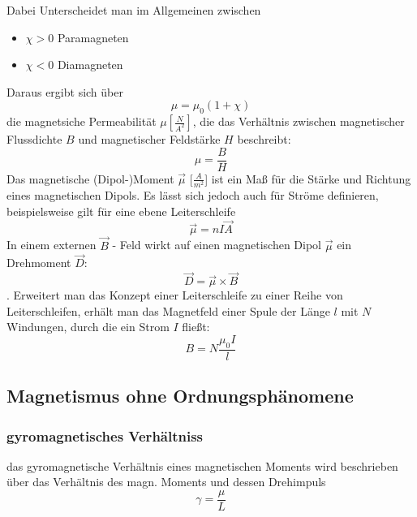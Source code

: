             Dabei Unterscheidet man im Allgemeinen zwischen
            \begin{itemize}
                \item $\chi > 0$ Paramagneten
                \item $\chi < 0$ Diamagneten
            \end{itemize}
            Daraus ergibt sich über
            \begin{equation}
                \mu = \mu_0 (1 + \chi)
            \end{equation}
            die magnetsiche Permeabilität $\mu [\frac{N}{A^2}]$, die das Verhältnis zwischen magnetischer Flussdichte $B$ und magnetischer Feldstärke $H$ beschreibt:
            $$ \mu = \frac{B}{H}$$
            Das magnetische (Dipol-)Moment $\vec{\mu}$ [$\frac{A}{m^2}$] ist ein Maß für die Stärke
            und Richtung eines magnetischen Dipols. Es lässt sich jedoch auch für Ströme definieren, beispielsweise gilt für eine ebene
            Leiterschleife
            \begin{equation}
                \vec{\mu} = n I \vec{A}
            \end{equation}
            In einem externen $\vec{B}$ - Feld wirkt auf einen magnetischen Dipol $\vec{\mu}$ ein Drehmoment $\vec{D}$:
            \begin{equation}
                \vec{D} = \vec{\mu} \times \vec{B}
            \end{equation}.
            Erweitert man das Konzept einer Leiterschleife zu einer Reihe von Leiterschleifen, erhält man das Magnetfeld einer Spule der Länge $l$ mit $N$ Windungen, durch die ein Strom $I$ fließt:
            \begin{equation}
                B = N \frac{\mu_0 I}{l}
            \end{equation}
    \subsection{Magnetismus ohne Ordnungsphänomene}
        \subsubsection*{gyromagnetisches Verhältniss}
            das gyromagnetische Verhältnis eines magnetischen Moments wird beschrieben über das Verhältnis
            des magn. Moments und dessen Drehimpuls
            \begin{equation}
                \gamma = \frac{\mu}{L}
            \end{equation}
